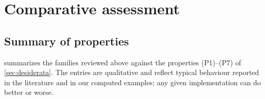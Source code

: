 \section{Comparative assessment}
\label{sec:assessment}

\subsection{Summary of properties}

 summarizes the families reviewed above against the
properties (P1)--(P7) of \cref{sec:desiderata}. The entries are qualitative and
reflect typical behaviour reported in the literature and in our computed
examples; any given implementation can do better or worse.

